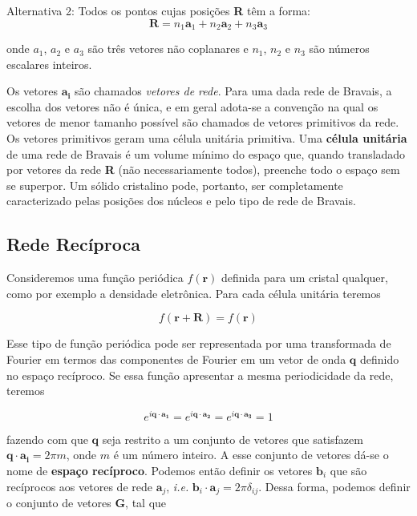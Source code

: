 		\begin{def1}{Alternativa 2:}
			\label{defi4.2}
			Todos os pontos cujas posições \textbf{R} têm a forma: 
				\begin{equation}
				\label{eqR}
				\textbf{R} = n_{1}\textbf{a}_{1}+ n_{2}\textbf{a}_2 + n_{3}\textbf{a}_3 
				\end{equation}
	
		onde $a_{1}$, $a_{2}$ e $a_{3}$ são três vetores não coplanares e $n_{1}$, $n_{2}$ e $n_{3}$ são números escalares inteiros.
		\end{def1}


		Os vetores $\mathbf{a_i}$ são chamados \textit{vetores de rede}. Para uma dada rede de Bravais, a escolha dos vetores não é única, e em geral adota-se a convenção na qual os vetores de menor tamanho possível são chamados de vetores primitivos da rede. Os vetores primitivos geram uma célula unitária primitiva. Uma \textbf{célula unitária} de uma rede de Bravais é um volume mínimo do espaço que, quando transladado por vetores da rede \textbf{R} (não necessariamente todos), preenche todo o espaço sem se superpor. Um sólido cristalino pode, portanto, ser completamente caracterizado pelas posições dos núcleos e pelo tipo de rede de Bravais.

	\subsection{Rede Recíproca}	

		Consideremos uma função periódica $f(\mathbf{r})$ definida para um cristal qualquer, como por exemplo a densidade eletrônica. Para cada célula unitária teremos

		\begin{equation}
			f(\mathbf{r} + \mathbf{R}) = f(\mathbf{r}) 
		\end{equation}

		Esse tipo de função periódica pode ser representada por uma transformada de Fourier em termos das componentes de Fourier em um vetor de onda $\mathbf{q}$ definido no espaço recíproco. Se essa função apresentar a mesma periodicidade da rede, teremos
		
		\begin{equation}
			e^{i\mathbf{q}\cdot \mathbf{a_1}} = e^{i\mathbf{q}\cdot \mathbf{a_2}} = e^{i\mathbf{q}\cdot \mathbf{a_3}} = 1
		\end{equation}
		
		fazendo com que $\mathbf{q}$ seja restrito a um conjunto de vetores que satisfazem $\mathbf{q} \cdot \mathbf{a_i} = 2\pi m$, onde $m$ é um número inteiro. A esse conjunto de vetores dá-se o nome de \textbf{espaço recíproco}. Podemos então definir os vetores $\mathbf{b}_i$ que são recíprocos aos vetores de rede $\mathbf{a}_j$, \textit{i.e.} $\mathbf{b}_i \cdot \mathbf{a}_j = 2\pi\delta_{ij}$. Dessa forma, podemos definir o conjunto de vetores $\mathbf{G}$, tal que 
		
